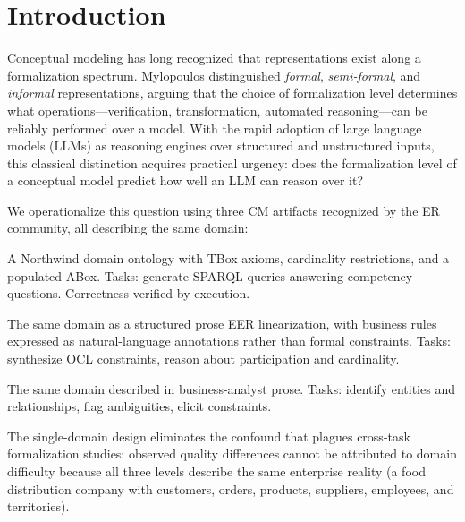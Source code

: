 \documentclass[runningheads]{llncs}
\begin{document}
\section{Introduction}
\label{sec:intro}

Conceptual modeling has long recognized that representations exist along a formalization spectrum. Mylopoulos \cite{mylopoulos1992conceptual} distinguished \emph{formal}, \emph{semi-formal}, and \emph{informal} representations, arguing that the choice of formalization level determines what operations---verification, transformation, automated reasoning---can be reliably performed over a model. With the rapid adoption of large language models (LLMs) as reasoning engines over structured and unstructured inputs, this classical distinction acquires practical urgency: does the formalization level of a conceptual model predict how well an LLM can reason over it?

We operationalize this question using three CM artifacts recognized by the ER community, all describing the same domain:

\begin{description}[noitemsep,style=nextline]
  \item[High-formal: OWL~2 ontology.]
    A Northwind domain ontology with TBox axioms, cardinality restrictions, and a populated ABox. Tasks: generate SPARQL queries answering competency questions. Correctness verified by execution.
  \item[Semi-formal: EER diagram with NL annotations.]
    The same domain as a structured prose EER linearization, with business rules expressed as natural-language annotations rather than formal constraints. Tasks: synthesize OCL constraints, reason about participation and cardinality.
  \item[Low-formal: NL requirements document.]
    The same domain described in business-analyst prose. Tasks: identify entities and relationships, flag ambiguities, elicit constraints.
\end{description}

\noindent The single-domain design eliminates the confound that plagues cross-task formalization studies: observed quality differences cannot be attributed to domain difficulty because all three levels describe the same enterprise reality (a food distribution company with customers, orders, products, suppliers, employees, and territories).
\end{document}
